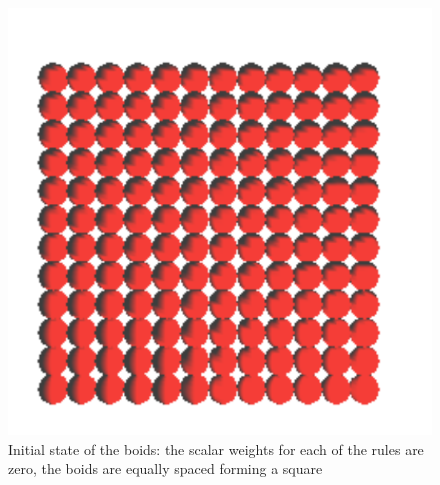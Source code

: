 \begin{figure}[htbp]
\begin{center}
\includegraphics[scale=0.5]{figures/align.pdf}
\caption{Initial state of the boids: the scalar weights for each of the rules are zero, the boids are equally spaced forming a square}
\label{alignRule}
\end{center}
\end{figure}

